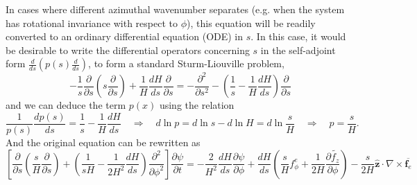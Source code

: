 In cases where different azimuthal wavenumber separates (e.g. when the system has rotational invariance with respect to $\phi$), this equation will be readily converted to an ordinary differential equation (ODE) in $s$. In this case, it would be desirable to write the differential operators concerning $s$ in the self-adjoint form $\frac{d}{ds}(p(s)\frac{d}{ds})$, to form a standard Sturm-Liouville problem,
\[
    -\frac{1}{s}\frac{\partial}{\partial s} \left(s \frac{\partial}{\partial s}\right) + \frac{1}{H} \frac{dH}{ds} \frac{\partial}{\partial s} = - \frac{\partial^2}{\partial s^2} - \left(\frac{1}{s} - \frac{1}{H}\frac{dH}{ds}\right) \frac{\partial}{\partial s}
\]
and we can deduce the term $p(x)$ using the relation
\[
    \frac{1}{p(s)}\frac{d p(s)}{ds} = \frac{1}{s} - \frac{1}{H}\frac{dH}{ds}\quad \Longrightarrow \quad d \ln p = d\ln s - d\ln H = d \ln \frac{s}{H} \quad \Longrightarrow\quad p = \frac{s}{H}.
\]
And the original equation can be rewritten as 
\begin{equation}\label{eqn:streamfunction-eqn-fine}
    \left[\frac{\partial}{\partial s}\left(\frac{s}{H}\frac{\partial}{\partial s}\right) + \left(\frac{1}{sH} - \frac{1}{2H^2} \frac{dH}{ds}\right)\frac{\partial^2}{\partial \phi^2}\right] \frac{\partial \psi}{\partial t} = - \frac{2}{H^2}\frac{dH}{ds} \frac{\partial \psi}{\partial \phi} + \frac{dH}{ds} \left(\frac{s}{H} f_\phi^e + \frac{1}{2H}\frac{\partial \widetilde{f_z}}{\partial \phi}\right) - \frac{s}{2H}\hat{\mathbf{z}}\cdot \nabla\times \overline{\mathbf{f}_e}
\end{equation}
